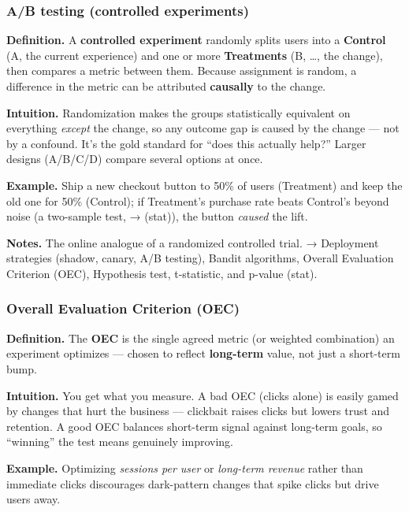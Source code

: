 \documentclass[
  10pt,
  letterpaper,
  onecolumn]{article}
\begin{document}
\hypertarget{ab-testing-controlled-experiments}{%
\subsubsection{A/B testing (controlled
experiments)}\label{ab-testing-controlled-experiments}}

\textbf{Definition.} A \textbf{controlled experiment} randomly splits
users into a \textbf{Control} (A, the current experience) and one or
more \textbf{Treatments} (B, \ldots, the change), then compares a metric
between them. Because assignment is random, a difference in the metric
can be attributed \textbf{causally} to the change.

\textbf{Intuition.} Randomization makes the groups statistically
equivalent on everything \emph{except} the change, so any outcome gap is
caused by the change --- not by a confound. It's the gold standard for
``does this actually help?'' Larger designs (A/B/C/D) compare several
options at once.

\textbf{Example.} Ship a new checkout button to 50\% of users
(Treatment) and keep the old one for 50\% (Control); if Treatment's
purchase rate beats Control's beyond noise (a two-sample test, →
(stat)), the button \emph{caused} the lift.

\textbf{Notes.} The online analogue of a randomized controlled trial. →
Deployment strategies (shadow, canary, A/B testing), Bandit algorithms,
Overall Evaluation Criterion (OEC), Hypothesis test, t-statistic, and
p-value (stat).

\hypertarget{overall-evaluation-criterion-oec}{%
\subsubsection{Overall Evaluation Criterion
(OEC)}\label{overall-evaluation-criterion-oec}}

\textbf{Definition.} The \textbf{OEC} is the single agreed metric (or
weighted combination) an experiment optimizes --- chosen to reflect
\textbf{long-term} value, not just a short-term bump.

\textbf{Intuition.} You get what you measure. A bad OEC (clicks alone)
is easily gamed by changes that hurt the business --- clickbait raises
clicks but lowers trust and retention. A good OEC balances short-term
signal against long-term goals, so ``winning'' the test means genuinely
improving.

\textbf{Example.} Optimizing \emph{sessions per user} or \emph{long-term
revenue} rather than immediate clicks discourages dark-pattern changes
that spike clicks but drive users away.
\end{document}
